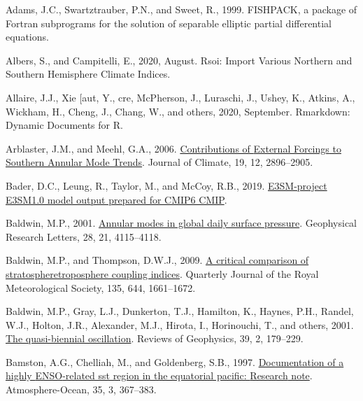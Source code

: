 \documentclass[12pt,oneside]{reedthesis}
\newlength{\cslhangindent}
\newenvironment{CSLReferences}[2] %
 {%
  \setlength{\parindent}{0pt}
  \ifodd #1 \everypar{\setlength{\hangindent}{\cslhangindent}}\ignorespaces\fi
  \ifnum #2 > 0
  \setlength{\parskip}{#2\baselineskip}
  \fi
 }%
 {}
\begin{document}
\noindent

\setlength{\parindent}{-0.20in}

\hypertarget{refs}{}
\begin{CSLReferences}{1}{0}
\leavevmode{}%
Adams, J.C., Swartztrauber, P.N., and Sweet, R., 1999. {FISHPACK}, a package of {Fortran} subprograms for the solution of separable elliptic partial differential equations.

\leavevmode{}%
Albers, S., and Campitelli, E., 2020, August. Rsoi: {Import Various Northern} and {Southern Hemisphere Climate Indices}.

\leavevmode{}%
Allaire, J.J., Xie {[}aut, Y., cre, McPherson, J., Luraschi, J., Ushey, K., Atkins, A., Wickham, H., Cheng, J., Chang, W., and others, 2020, September. Rmarkdown: {Dynamic Documents} for {R}.

\leavevmode{}%
Arblaster, J.M., and Meehl, G.A., 2006. \href{https://doi.org/10.1175/JCLI3774.1}{Contributions of {External Forcings} to {Southern Annular Mode Trends}}. Journal of Climate, 19, 12, 2896--2905.

\leavevmode{}%
Bader, D.C., Leung, R., Taylor, M., and McCoy, R.B., 2019. \href{https://doi.org/10.22033/ESGF/CMIP6.2294}{E3SM-project E3SM1.0 model output prepared for CMIP6 CMIP}.

\leavevmode{}%
Baldwin, M.P., 2001. \href{https://doi.org/10.1029/2001GL013564}{Annular modes in global daily surface pressure}. Geophysical Research Letters, 28, 21, 4115--4118.

\leavevmode{}%
Baldwin, M.P., and Thompson, D.W.J., 2009. \href{https://doi.org/10.1002/qj.479}{A critical comparison of stratosphere\textendash troposphere coupling indices}. Quarterly Journal of the Royal Meteorological Society, 135, 644, 1661--1672.

\leavevmode{}%
Baldwin, M.P., Gray, L.J., Dunkerton, T.J., Hamilton, K., Haynes, P.H., Randel, W.J., Holton, J.R., Alexander, M.J., Hirota, I., Horinouchi, T., and others, 2001. \href{https://doi.org/10.1029/1999RG000073}{The quasi-biennial oscillation}. Reviews of Geophysics, 39, 2, 179--229.

\leavevmode{}%
Bamston, A.G., Chelliah, M., and Goldenberg, S.B., 1997. \href{https://doi.org/10.1080/07055900.1997.9649597}{Documentation of a highly {ENSO}-related sst region in the equatorial pacific: {Research} note}. Atmosphere-Ocean, 35, 3, 367--383.


\end{CSLReferences}
\end{document}

